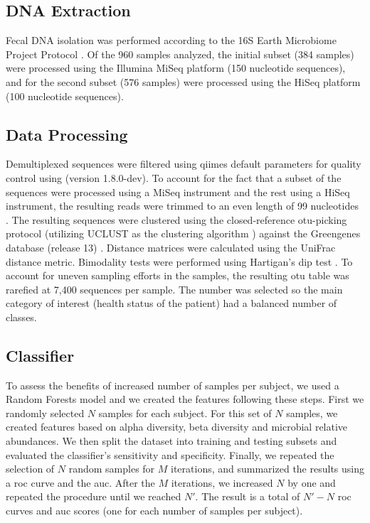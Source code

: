 \subsection{DNA Extraction}

Fecal DNA isolation was performed according to the 16S Earth Microbiome Project Protocol \cite{RN164}. Of the 960 samples analyzed, the initial subset (384 samples)  were processed using the Illumina MiSeq platform (150 nucleotide sequences), and for the second subset (576 samples) were processed using the HiSeq platform (100 nucleotide sequences).

\subsection{Data Processing}

Demultiplexed sequences were filtered using \glspl{qiime} \cite{RN110} default parameters for quality control using (version 1.8.0-dev). To account for the fact that a subset of the sequences were processed using a MiSeq instrument and the rest using a HiSeq instrument, the resulting reads were trimmed to an even length of 99 nucleotides \cite{RN4221, RN4222}. The resulting sequences were clustered using the closed-reference \gls{otu}-picking protocol (utilizing UCLUST as the clustering algorithm \cite{RN3776}) against the Greengenes database (release 13) \cite{RN165}. Distance matrices were calculated using the UniFrac \cite{RN3770} distance metric. Bimodality tests were performed using Hartigan’s dip test \cite{RN4017}. To account for uneven sampling efforts in the samples, the resulting \gls{otu} table was rarefied at 7,400 sequences per sample. The number was selected so the main category of interest (health status of the patient) had a balanced number of classes.

\subsection{Classifier}

To assess the benefits of increased number of samples per subject, we used a Random Forests \cite{RN4205} model and we created the features following these steps. First we randomly selected $N$ samples for each subject.  For this set of $N$ samples, we created features based on alpha diversity, beta diversity and microbial relative abundances. We then split the dataset into training and testing subsets and evaluated the classifier's sensitivity and specificity. Finally, we repeated the selection of $N$ random samples for $M$ iterations, and summarized the results using a \gls{roc} curve and the \gls{auc}. After the $M$ iterations, we increased $N$ by one and repeated the procedure until we reached $N'$. The result is a total of $N'-N$ \gls{roc} curves and \gls{auc} scores (one for each number of samples per subject).

